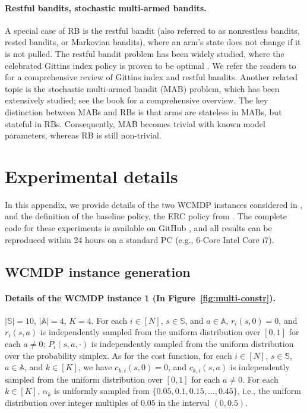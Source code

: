 \documentclass{article}
\theoremstyle{plain}
\theoremstyle{remark}
\newcommand{\sspa}{\mathbb{S}}
\newcommand{\aspa}{\mathbb{A}}
\begin{document}
\paragraph{Restful bandits, stochastic multi-armed bandits.}
A special case of RB is the restful bandit (also referred to as nonrestless bandits, rested bandits, or Markovian bandits), where an arm's state does not change if it is not pulled.
The restful bandit problem has been widely studied, where the celebrated Gittins index policy is proven to be optimal \citep{GitJon_74,Git_79,BerNin_96,Tsi_94,Web_92,VarWalBuy_85,Whi_80}. We refer the readers to \citep{GitGlaWeb_11} for a comprehensive review of Gittins index and restful bandits. 
Another related topic is the stochastic multi-armed bandit (MAB) problem, which has been extensively studied; see the book \citep{LatSze_20} for a comprehensive overview. 
The key distinction between MABs and RBs is that arms are stateless in MABs, but stateful in RBs. Consequently, MAB becomes trivial with known model parameters, whereas RB is still non-trivial. 



\section{Experimental details}
\label{app:details}
In this appendix, we provide details of the two WCMDP instances considered in , and the definition of the baseline policy, the ERC policy from \citep{XioWanLi_22}. 
The complete code for these experiments is available on GitHub \citep{ZhaHonWan_25_github}, and all results can be reproduced within 24 hours on a standard PC (e.g., 6-Core Intel Core i7).


\subsection{WCMDP instance generation}
\label{app:exp_details}

\paragraph{Details of the WCMDP instance 1 (In Figure~\ref{fig:multi-constr}).}
$|\sspa| = 10$, $|\aspa| = 4$, $K = 4$.
For each $i\in[N]$, $s\in\sspa$, and $a\in\aspa$, $r_i(s,0) = 0$, and $r_i(s,a)$ is independently sampled from the uniform distribution over $[0,1]$ for each $a\neq 0$; $P_{i}(s,a,\cdot)$ is independently sampled from the uniform distribution over the probability simplex. 
As for the cost function, for each $i\in[N]$, $s\in\sspa$, $a\in\aspa$, and $k\in[K]$, we have $c_{k,i}(s,0)=0$, and $c_{k,i}(s,a)$ is independently sampled from the uniform distribution over $[0,1]$ for each $a\neq 0$. 
For each $k\in[K]$, $\alpha_k$ is uniformly sampled from $\{0.05, 0.1, 0.15, \dots, 0.45\}$, i.e., the uniform distribution over integer multiples of $0.05$ in the interval $(0,0.5)$. 
\end{document}
